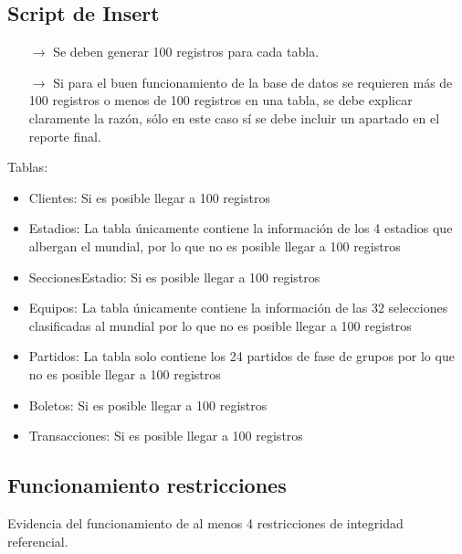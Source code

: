     
\subsection{Script de Insert}
\begin{itemize}
    \item[$\rightarrow$] Se deben generar 100 registros para cada tabla.
    \item[$\rightarrow$] Si para el buen funcionamiento de la base de datos se requieren más de 100 registros o
            menos de 100 registros en una tabla, se debe explicar claramente la razón, sólo en este caso
            sí se debe incluir un apartado en el reporte final.
\end{itemize}

Tablas:
\begin{itemize}
    \item Clientes: Si es posible llegar a 100 registros 
    \item Estadios: La tabla únicamente contiene la información de los 4 estadios que albergan el mundial, por lo que no es posible llegar a 100 registros
    \item SeccionesEstadio: Si es posible llegar a 100 registros 
    \item Equipos: La tabla únicamente contiene la información de las 32 selecciones clasificadas al mundial por lo que no es posible llegar a 100 registros
    \item Partidos: La tabla solo contiene los 24 partidos de fase de grupos por lo que no es posible llegar a 100 registros
    \item Boletos: Si es posible llegar a 100 registros 
    \item Transacciones: Si es posible llegar a 100 registros 
\end{itemize}


\subsection{Funcionamiento restricciones}

Evidencia del funcionamiento de al menos 4 restricciones de integridad referencial.

